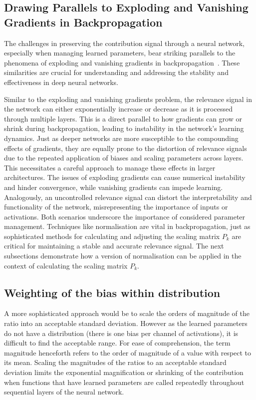 \subsection{Drawing Parallels to Exploding and Vanishing Gradients in Backpropagation}
\label{sec:parallels}

The challenges in preserving the contribution signal through a neural network, especially when managing learned parameters, bear striking parallels to the phenomena of exploding and vanishing gradients in backpropagation~\cite{DBLP:journals/tnn/BengioSF94}. These similarities are crucial for understanding and addressing the stability and effectiveness in deep neural networks.

Similar to the exploding and vanishing gradients problem, the relevance signal in the network can either exponentially increase or decrease as it is processed through multiple layers. This is a direct parallel to how gradients can grow or shrink during backpropagation, leading to instability in the network's learning dynamics. Just as deeper networks are more susceptible to the compounding effects of gradients, they are equally prone to the distortion of relevance signals due to the repeated application of biases and scaling parameters across layers. This necessitates a careful approach to manage these effects in larger architectures. The issues of exploding gradients can cause numerical instability and hinder convergence, while vanishing gradients can impede learning. Analogously, an uncontrolled relevance signal can distort the interpretability and functionality of the network, misrepresenting the importance of inputs or activations. Both scenarios underscore the importance of considered parameter management. Techniques like normalisation are vital in backpropagation, just as sophisticated methods for calculating and adjusting the scaling matrix \( P_{k} \) are critical for maintaining a stable and accurate relevance signal. The next subsections demonstrate how a version of normalisation can be applied in the context of calculating the scaling matrix \(P_{k}\).

\subsection{Weighting of the bias within distribution}

A more sophisticated approach would be to scale the orders of magnitude of the ratio into an acceptable standard deviation. However as the learned parameters do not have a distribution (\eg there is one bias per channel of activations), it is difficult to find the acceptable range.  For ease of comprehension, the term magnitude henceforth refers to the order of magnitude of a value with respect to its mean. Scaling the magnitudes of the ratios to an acceptable standard deviation limits the exponential magnification or shrinking of the contribution when functions that have learned parameters are called repeatedly throughout sequential layers of the neural network. 

